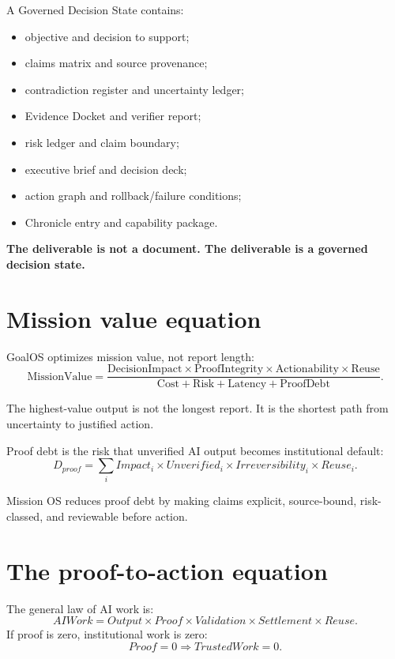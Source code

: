 \documentclass[11pt]{article}
\newcommand{\keyline}[1]{\begin{goldbox}\textbf{#1}\end{goldbox}}
\begin{document}
A Governed Decision State contains:
\begin{itemize}
\item objective and decision to support;
\item claims matrix and source provenance;
\item contradiction register and uncertainty ledger;
\item Evidence Docket and verifier report;
\item risk ledger and claim boundary;
\item executive brief and decision deck;
\item action graph and rollback/failure conditions;
\item Chronicle entry and capability package.
\end{itemize}

\keyline{The deliverable is not a document. The deliverable is a governed decision state.}

\section{Mission value equation}
GoalOS optimizes mission value, not report length:
\begin{equation}
\mathrm{MissionValue}=\frac{\mathrm{DecisionImpact}\times\mathrm{ProofIntegrity}\times\mathrm{Actionability}\times\mathrm{Reuse}}{\mathrm{Cost}+\mathrm{Risk}+\mathrm{Latency}+\mathrm{ProofDebt}}.
\end{equation}

The highest-value output is not the longest report. It is the shortest path from uncertainty to justified action.

Proof debt is the risk that unverified AI output becomes institutional default:
\begin{equation}
D_{proof}=\sum_i Impact_i\times Unverified_i\times Irreversibility_i\times Reuse_i.
\end{equation}

Mission OS reduces proof debt by making claims explicit, source-bound, risk-classed, and reviewable before action.

\section{The proof-to-action equation}
The general law of AI work is:
\begin{equation}
AIWork=Output\times Proof\times Validation\times Settlement\times Reuse.
\end{equation}
If proof is zero, institutional work is zero:
\begin{equation}
Proof=0 \Rightarrow TrustedWork=0.
\end{equation}
\end{document}
